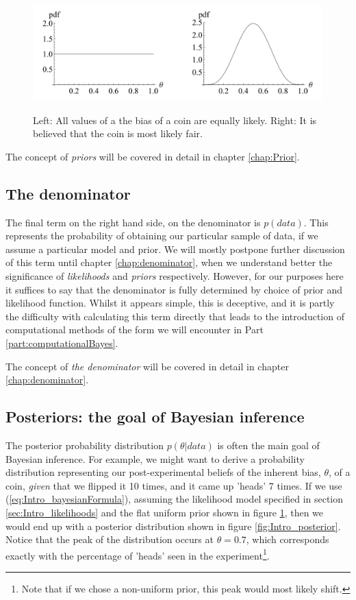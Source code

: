 \documentclass[11pt,fullpage]{book}
\begin{document}
\begin{figure}
\centering
\scalebox{0.6} 
{\includegraphics{Intro_priors.pdf}}
\caption{Left: All values of a the bias of a coin are equally likely. Right: It is believed that the coin is most likely fair.}\label{fig:Intro_priors}
\end{figure}

The concept of \textit{priors} will be covered in detail in chapter \ref{chap:Prior}.

\subsection{The denominator}
The final term on the right hand side, on the denominator is $p(data)$. This represents the probability of obtaining our particular sample of data, if we assume a particular model and prior. We will mostly postpone further discussion of this term until chapter \ref{chap:denominator}, when we understand better the significance of \textit{likelihoods} and \textit{priors} respectively. However, for our purposes here it suffices to say that the denominator is fully determined by choice of prior and likelihood function. Whilst it appears simple, this is deceptive, and it is partly the difficulty with calculating this term directly that leads to the introduction of computational methods of the form we will encounter in Part \ref{part:computationalBayes}.

The concept of \textit{the denominator} will be covered in detail in chapter \ref{chap:denominator}.

\subsection{Posteriors: the goal of Bayesian inference}
The posterior probability distribution $p(\theta|data)$ is often the main goal of Bayesian inference. For example, we might want to derive a probability distribution representing our post-experimental beliefs of the inherent bias, $\theta$, of a coin, \textit{given} that we flipped it 10 times, and it came up 'heads' 7 times. If we use (\ref{eq:Intro_bayesianFormula}), assuming the likelihood model specified in section \ref{sec:Intro_likelihoods} and the flat uniform prior shown in figure \ref{fig:Intro_priors}, then we would end up with a posterior distribution shown in figure \ref{fig:Intro_posterior}. Notice that the peak of the distribution occurs at $\theta=0.7$, which corresponds exactly with the percentage of 'heads' seen in the experiment\footnote{Note that if we chose a non-uniform prior, this peak would most likely shift.}. 
\end{document}
